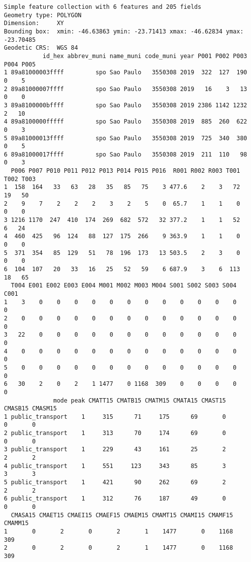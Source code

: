 \documentclass[
  letterpaper,
  DIV=11,
  numbers=noendperiod]{scrreprt}
\begin{document}
\begin{verbatim}
Simple feature collection with 6 features and 205 fields
Geometry type: POLYGON
Dimension:     XY
Bounding box:  xmin: -46.63863 ymin: -23.71413 xmax: -46.62834 ymax: -23.70485
Geodetic CRS:  WGS 84
           id_hex abbrev_muni name_muni code_muni year P001 P002 P003 P004 P005
1 89a81000003ffff         spo Sao Paulo   3550308 2019  322  127  190    0    5
2 89a81000007ffff         spo Sao Paulo   3550308 2019   16    3   13    0    0
3 89a8100000bffff         spo Sao Paulo   3550308 2019 2386 1142 1232    2   10
4 89a8100000fffff         spo Sao Paulo   3550308 2019  885  260  622    0    3
5 89a81000013ffff         spo Sao Paulo   3550308 2019  725  340  380    0    5
6 89a81000017ffff         spo Sao Paulo   3550308 2019  211  110   98    0    3
  P006 P007 P010 P011 P012 P013 P014 P015 P016  R001 R002 R003 T001 T002 T003
1  158  164   33   63   28   35   85   75    3 477.6    2    3   72   19   50
2    9    7    2    2    2    3    2    5    0  65.7    1    1    0    0    0
3 1216 1170  247  410  174  269  682  572   32 377.2    1    1   52    6   24
4  460  425   96  124   88  127  175  266    9 363.9    1    1    0    0    0
5  371  354   85  129   51   78  196  173   13 503.5    2    3    0    0    0
6  104  107   20   33   16   25   52   59    6 687.9    3    6  113   18   65
  T004 E001 E002 E003 E004 M001 M002 M003 M004 S001 S002 S003 S004 C001
1    3    0    0    0    0    0    0    0    0    0    0    0    0    0
2    0    0    0    0    0    0    0    0    0    0    0    0    0    0
3   22    0    0    0    0    0    0    0    0    0    0    0    0    0
4    0    0    0    0    0    0    0    0    0    0    0    0    0    0
5    0    0    0    0    0    0    0    0    0    0    0    0    0    0
6   30    2    0    2    1 1477    0 1168  309    0    0    0    0    0
              mode peak CMATT15 CMATB15 CMATM15 CMATA15 CMAST15 CMASB15 CMASM15
1 public_transport    1     315      71     175      69       0       0       0
2 public_transport    1     313      70     174      69       0       0       0
3 public_transport    1     229      43     161      25       2       2       2
4 public_transport    1     551     123     343      85       3       3       3
5 public_transport    1     421      90     262      69       2       2       2
6 public_transport    1     312      76     187      49       0       0       0
  CMASA15 CMAET15 CMAEI15 CMAEF15 CMAEM15 CMAMT15 CMAMI15 CMAMF15 CMAMM15
1       0       2       0       2       1    1477       0    1168     309
2       0       2       0       2       1    1477       0    1168     309

\end{verbatim}
\end{document}
